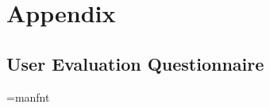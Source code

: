 \chapter{Appendix}

\section{User Evaluation Questionnaire}

\ifx\pdfoutput\undefined
\else
    \pdfpagewidth=210mm
    \pdfpageheight=297mm
\fi

\newif\ifbanner\bannerfalse
\bannerfalse
\advance\oddsidemargin-5mm
\advance\textwidth1cm

\font\manual=manfnt
\def\shared{\noindent\llap{\manual\char'170\kern.15em}}

\def\heading#1{
    \ifhmode\par\fi
    \removelastskip
    \vskip1ex plus 0.5ex minus 0.3 ex%
    \noindent
    \hbox to \hsize{ #1\hfill}
    \smallskip\par\nobreak}


\def\nicefrac#1/#2{\leavevmode%
    \raise.5ex\hbox{\the\scriptfont0 #1}%
    \kern-.1em/\kern-.15em%
    \lower.25ex\hbox{\the\scriptfont0 #2}}

\newdimen\scalewidth
{}\hsize 

\def\xboxit#1{\hbox{\lower0.7ex\vbox{\hrule\hbox{\vrule\kern1pt
    \vbox{\kern1pt\hbox{\strut\small #1}\kern1pt}\kern1pt\vrule}\hrule}}}

\def\boxit#1{\hbox{\lower0.7ex\vbox{\hrule\hbox{\vrule\kern1pt
    \vbox{\kern1pt\hbox to 1.4em
    {\small\strut\hfil #1\hfil}\kern1pt}\kern1pt\vrule}\hrule}}}

\def\sboxit{\hbox{\lower0.7ex\vbox{\hrule\hbox{\vrule\kern1pt
    \vbox{\kern1pt\hbox to 1ex
    {\small\strut\hfil}\kern1pt}\kern1pt\vrule}\hrule}}}


\def\fiveboxes#1#2#3#4#5{\hbox to\scalewidth
    {\boxit{#1}\hfil\boxit{#2}\hfil\boxit{#3}\hfil%
     \boxit{#4}\hfil\boxit{#5}}}
\def\manyboxes{\hbox to \scalewidth
    {\sboxit\hfil\sboxit\hfil\sboxit\hfil\sboxit\hfil\sboxit\hfil%
    \sboxit\hfil\sboxit\hfil\sboxit\hfil\sboxit\hfil\sboxit\hfil\sboxit}}


\def\boxes{\fiveboxes{}{}{}{}{}\ignorespaces}

\def\void{\boxit{}}

\def\xscale#1#2{%
    \setbox0=\hbox{\boxes}%
    \setbox1=\hbox to \wd0{\small\strut\hfill #2 $\to$}%
    \setbox2=\hbox to \wd0{\small\strut $\gets$ #1 \hfill}%
    \vbox{\vbox to 0pt{\vss\box1\box2\kern2pt}\vbox{\box0}}}

